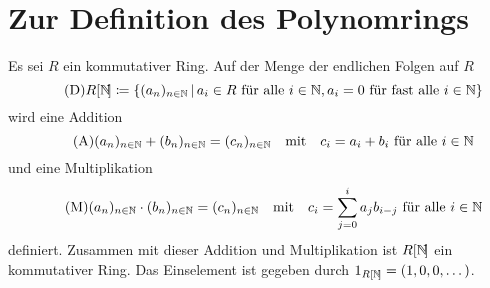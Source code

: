 \section{Zur Definition des Polynomrings}

Es sei $R$ ein kommutativer Ring.
Auf der Menge der endlichen Folgen auf $R$
\begin{equation}
  \tag{D}
  \label{equation: definition}
  R[\mathbb{N}\!]
  \coloneqq
  \{
    (a_n)_{n \in \mathbb{N}}
  \,|\,
    \text{$a_i \in R$ für alle $i \in \mathbb{N}$},
    \text{$a_i = 0$ für fast alle $i \in \mathbb{N}$} 
  \}
\end{equation}
wird eine Addition
\begin{equation}
  \tag{A}
  \label{equation: addition}
    (a_n)_{n \in \mathbb{N}} + (b_n)_{n \in \mathbb{N}}
  = (c_n)_{n \in \mathbb{N}}
  \quad\text{mit}\quad
  \text{$c_i = a_i + b_i$ für alle $i \in \mathbb{N}$}
\end{equation}
und eine Multiplikation
\begin{equation}
  \tag{M}
  \label{equation: multiplication}
    (a_n)_{n \in \mathbb{N}} \cdot (b_n)_{n \in \mathbb{N}}
  = (c_n)_{n \in \mathbb{N}}
  \quad\text{mit}\quad
  \text{$c_i = \sum_{j=0}^i a_j b_{i-j}$ für alle $i \in \mathbb{N}$}
\end{equation}
definiert.
Zusammen mit dieser Addition und Multiplikation ist $R[\mathbb{N}\!]$ ein kommutativer Ring.
Das Einselement ist gegeben durch $1_{R[\mathbb{N}\!]} = (1, 0, 0, \dotsc)$.

